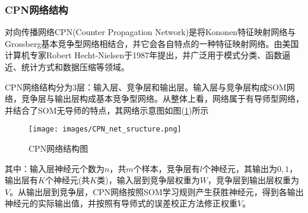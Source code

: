         \subsubsection{CPN网络结构}
            \par
            对向传播网络CPN(Counter Propagation Network)是将Kononen特征映射网络与Grossberg基本竞争型网络相结合，并它会各自特点的一种特征映射网络。由美国计算机专家Robert Hecht-Nielsen于1987年提出，并广泛用于模式分类、函数逼近、统计方式和数据压缩等领域。
            \par
            CPN网络结构分为3层：输入层、竞争层和输出层。输入层与竞争层构成SOM网络，竞争层与输出层构成基本竞争型网络。从整体上看，网络属于有导师型网络，并结合了SOM无导师的特点，其网络示意图如图(\ref{fig:CPN网络结构图})所示
            \begin{figure}[H]
            \centering
            \texttt{[image: images/CPN\_net\_sructure.png]}
            \caption{CPN网络结构图}
            \label{fig:CPN网络结构图}
            \end{figure}
            其中：输入层神经元个数为$n$，共$m$个样本，竞争层有$l$个神经元，其输出为$0,1$，输出层有$K$个神经元(共$K$类)，输入层到竞争层权重为$W$，竞争层到输出层权重为$V$。从输出层到竞争层，CPN网络按照SOM学习规则产生获胜神经元，得到各输出神经元的实际输出值，并按照有导师式的误差校正方法修正权重$V$。
